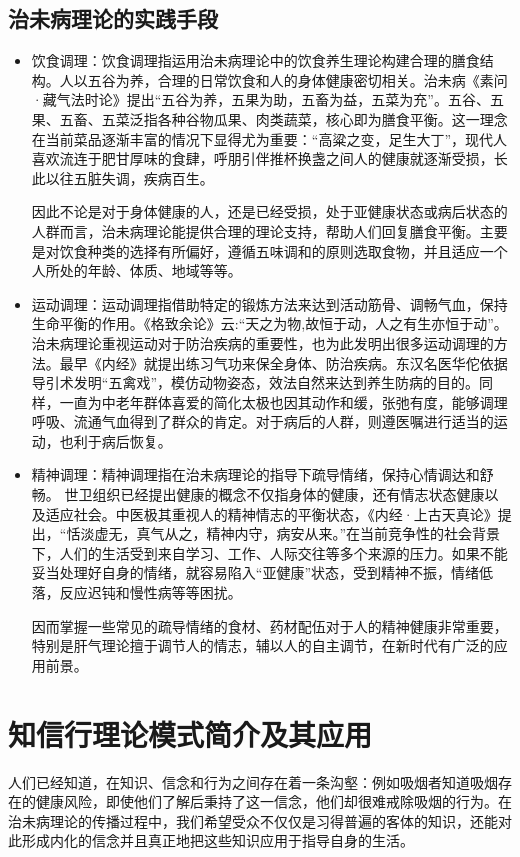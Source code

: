 \subsection{治未病理论的实践手段}
\begin{itemize}
\item 饮食调理：饮食调理指运用治未病理论中的饮食养生理论构建合理的膳食结构。人以五谷为养，合理的日常饮食和人的身体健康密切相关。治未病《素问·藏气法时论》提出“五谷为养，五果为助，五畜为益，五菜为充”。五谷、五果、五畜、五菜泛指各种谷物瓜果、肉类蔬菜，核心即为膳食平衡。这一理念在当前菜品逐渐丰富的情况下显得尤为重要：“高粱之变，足生大丁”，现代人喜欢流连于肥甘厚味的食肆，呼朋引伴推杯换盏之间人的健康就逐渐受损，长此以往五脏失调，疾病百生。

因此不论是对于身体健康的人，还是已经受损，处于亚健康状态或病后状态的人群而言，治未病理论能提供合理的理论支持，帮助人们回复膳食平衡。主要是对饮食种类的选择有所偏好，遵循五味调和的原则选取食物，并且适应一个人所处的年龄、体质、地域等等。
\item 运动调理：运动调理指借助特定的锻炼方法来达到活动筋骨、调畅气血，保持生命平衡的作用。《格致余论》云:“天之为物,故恒于动，人之有生亦恒于动”。治未病理论重视运动对于防治疾病的重要性，也为此发明出很多运动调理的方法。最早《内经》就提出练习气功来保全身体、防治疾病。东汉名医华佗依据导引术发明“五禽戏”，模仿动物姿态，效法自然来达到养生防病的目的。同样，一直为中老年群体喜爱的简化太极也因其动作和缓，张弛有度，能够调理呼吸、流通气血得到了群众的肯定。对于病后的人群，则遵医嘱进行适当的运动，也利于病后恢复。

\item 精神调理：精神调理指在治未病理论的指导下疏导情绪，保持心情调达和舒畅。
世卫组织已经提出健康的概念不仅指身体的健康，还有情志状态健康以及适应社会。中医极其重视人的精神情志的平衡状态，《内经·上古天真论》提出，“恬淡虚无，真气从之，精神内守，病安从来。”在当前竞争性的社会背景下，人们的生活受到来自学习、工作、人际交往等多个来源的压力。如果不能妥当处理好自身的情绪，就容易陷入“亚健康”状态，受到精神不振，情绪低落，反应迟钝和慢性病等等困扰。

因而掌握一些常见的疏导情绪的食材、药材配伍对于人的精神健康非常重要，特别是肝气理论擅于调节人的情志，辅以人的自主调节，在新时代有广泛的应用前景。
\end{itemize}
\section{知信行理论模式简介及其应用}
人们已经知道，在知识、信念和行为之间存在着一条沟壑：例如吸烟者知道吸烟存在的健康风险，即使他们了解后秉持了这一信念，他们却很难戒除吸烟的行为。在治未病理论的传播过程中，我们希望受众不仅仅是习得普遍的客体的知识，还能对此形成内化的信念并且真正地把这些知识应用于指导自身的生活。

